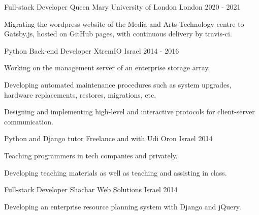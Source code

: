 \documentclass[11pt, a4paper]{awesome-cv}
\begin{document}
\begin{cventries}
  \cventry
    {Full-stack Developer} %
    {Queen Mary University of London} %
    {London} %
    {2020 - 2021} %
    {
      \begin{cvitems} %
        \item {Migrating the wordpress website of the Media and Arts Technology centre to Gatsby.js, hosted on GitHub pages, with continuous delivery by travis-ci.}
      \end{cvitems}
    }

  \cventry
    {Python Back-end Developer} %
    {XtremIO} %
    {Israel} %
    {2014 - 2016} %
    {
      \begin{cvitems} %
        \item {Working on the management server of an enterprise storage array.}
        \item {Developing automated maintenance procedures such as system upgrades, hardware replacements, restores, migrations, etc.}
        \item {Designing and implementing high-level and interactive protocols for client-server communication.}
      \end{cvitems}
    }

  \cventry
    {Python and Django tutor} %
    {Freelance and with Udi Oron} %
    {Israel} %
    {2014} %
    {
      \begin{cvitems} %
        \item {Teaching programmers in tech companies and privately.}
        \item {Developing teaching materials as well as teaching and assisting in class.}
      \end{cvitems}
    }

  \cventry
    {Full-stack Developer} %
    {Shachar Web Solutions} %
    {Israel} %
    {2014} %
    {
      \begin{cvitems} %
        \item {Developing an enterprise resource planning system with Django and jQuery.}
      \end{cvitems}
    }


\end{cventries}
\end{document}
